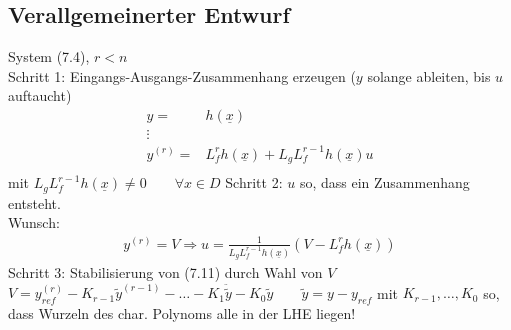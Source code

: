 \documentclass[ngerman]{tudscrreprt}
\begin{document}
\subsection{Verallgemeinerter Entwurf}
System (7.4), $r< n$\\
Schritt 1: Eingangs-Ausgangs-Zusammenhang erzeugen ($y$ solange ableiten, bis $u$ auftaucht)\\
\begin{align*}
y =& h(\underline x)\\
\vdots\\
y^{(r)} =&L_f ^r h(\underline x)  + L_g L_f ^{r-1} h(\underline x) u\\
\end{align*}
mit $L_g L_f ^{r-1} h(\underline x) \ne 0 \qquad \forall x\in D$
Schritt 2: $u$ so, dass ein Zusammenhang entsteht.\\
Wunsch: \begin{align*}y^(r) = V \Rightarrow u = \frac{1}{L_g L_f ^{r-1} h(\underline x)} (V - L_f ^r h(\underline x)) \tag{7.11} \end{align*}
Schritt 3: Stabilisierung von (7.11) durch Wahl von $V$\\
$V = y_{ref} ^{(r)} - K_{r-1} \tilde y ^{(r-1)} - \dots - K_1 \ddot \tilde y - K_0 \tilde y \qquad \tilde y = y- y_{ref}$ mit $K_{r-1},\dots, K_0$ so, dass Wurzeln des char. Polynoms alle in der LHE liegen!\\
\end{document}
